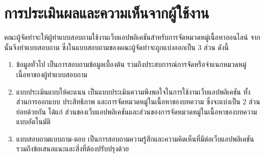 \documentclass[12pt,oneside,openright,a4paper]{cpe-thai-project}
\begin{document}
  \section{การประเมินผลและความเห็นจากผู้ใช้งาน}
    \hspace{1cm}คณะผู้จัดทำจะให้ผู้ทำแบบสอบถามใช้งานเว็บแอปพลิเคชันสำหรับการจัดหมวดหมู่เนื้อหาออนไลน์ จากนั้นจึงทำแบบสอบถาม
    ซึ่งในแบบสอบถามของคณะผู้จัดทำจะถูกแบ่งออกเป็น 3 ส่วน ดังนี้
    \begin{enumerate}
      \item ข้อมูลทั่วไป เป็นการสอบถามข้อมูลเบื้องต้น รวมถึงประสบการณ์การจัดหรือจำแนกหมวดหมู่เนื้อหาของผู้ทำแบบสอบถาม
      \item แบบประเมินแบบให้คะแนน เป็นแบบประเมินความพึงพอใจในการใช้งานเว็บแอปพลิเคชัน ทั้งส่วนการออกแบบ ประสิทธิภาพ และการจัดหมวดหมู่ในเนื้อหาของบทความ
            ซึ่งจะแบ่งเป็น 2 ส่วนย่อยด้วยกัน ได้แก่ ส่วนของเว็บแอปพลิเคชันและส่วนของการจัดหมวดหมู่ในเนื้อหาของบทความแบบอัตโนมัติ
      \item แบบสอบถามแบบถาม-ตอบ เป็นการสอบถามความรู้สึกและความคิดเห็นที่มีต่อเว็บแอปพลิเคชัน รวมถึงข้อเสนอแนะและสิ่งที่ต้องปรับปรุงด้วย
    \end{enumerate}
    
\end{document}
